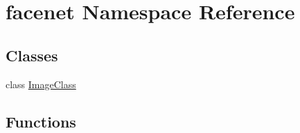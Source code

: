 \hypertarget{namespacefacenet}{}\section{facenet Namespace Reference}
\label{namespacefacenet}
\subsection*{Classes}
\begin{DoxyCompactItemize}
\item 
class \hyperlink{classfacenet_1_1ImageClass}{Image\+Class}
\end{DoxyCompactItemize}
\subsection*{Functions}
